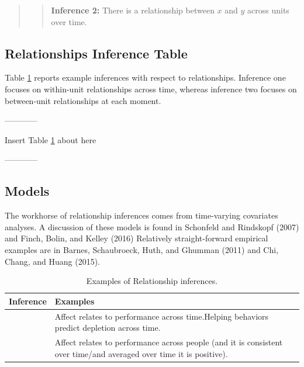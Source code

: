 \documentclass[english,,man]{apa6}
\theoremstyle{definition}
\theoremstyle{definition}
\theoremstyle{definition}
\theoremstyle{remark}
\begin{document}
\begin{quote}
\begin{quote}
\textbf{Inference 2:} There is a relationship between \(x\) and \(y\)
across units over time.
\end{quote}
\end{quote}

\hypertarget{relationships-inference-table}{%
\subsection{Relationships Inference
Table}\label{relationships-inference-table}}

Table \ref{relationships_table} reports example inferences with respect
to relationships. Inference one focuses on within-unit relationships
across time, whereas inference two focuses on between-unit relationships
at each moment.

\begin{center}

------------

Insert Table \ref{relationships_table} about here

------------

\end{center}

\hypertarget{models-2}{%
\subsection{Models}\label{models-2}}

The workhorse of relationship inferences comes from time-varying
covariates analyses. A discussion of these models is found in Schonfeld
and Rindskopf (2007) and Finch, Bolin, and Kelley (2016) Relatively
straight-forward empirical examples are in Barnes, Schaubroeck, Huth,
and Ghumman (2011) and Chi, Chang, and Huang (2015).

\begin{table}

\caption{\label{tab:unnamed-chunk-16}\label{relationships_table}Examples of Relationship inferences.}
\centering
\begin{tabular}[t]{>{\raggedright\arraybackslash}p{5em}>{\raggedright\arraybackslash}p{30em}}
\toprule
Inference & Examples\\
\midrule
1 & Affect relates to performance across time.\newline Helping behaviors predict depletion across time.\\
\hline
2 & Affect relates to performance across people (and it is consistent over time/and averaged over time it is positive).\\
\bottomrule
\end{tabular}
\end{table}
\end{document}
